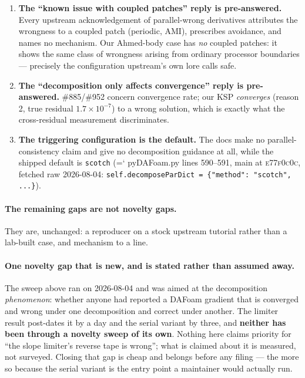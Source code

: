 \documentclass[11pt,a4paper]{article}
\newcommand{\artifact}[1]{{\small\ttfamily\hyphenchar\font=`\-\relax
  \def\_{\textunderscore\allowbreak}#1}}
\newcommand{\commit}[1]{\textsc{\small #1}}
\begin{document}
\begin{enumerate}
\item \textbf{The ``known issue with coupled patches'' reply is pre-answered.} Every upstream
acknowledgement of parallel-wrong derivatives attributes the wrongness to a coupled patch
(periodic, AMI), prescribes avoidance, and names no mechanism. Our Ahmed-body case has
\emph{no} coupled patches: it shows the same class of wrongness arising from ordinary
processor boundaries --- precisely the configuration upstream's own lore calls safe.
\item \textbf{The ``decomposition only affects convergence'' reply is pre-answered.}
\#885/\#952 concern convergence rate; our KSP \emph{converges} (reason 2, true residual
\(1.7\times10^{-7}\)) to a wrong solution, which is exactly what the cross-residual
measurement discriminates.
\item \textbf{The triggering configuration is the default.} The docs make no
parallel-consistency claim and give no decomposition guidance at all, while the shipped
default is \texttt{scotch} (\artifact{pyDAFoam.py} lines 590--591, main at \commit{e77f0c0c},
fetched raw 2026-08-04: \texttt{self.decomposeParDict = \{"method": "scotch", ...\}}).
\end{enumerate}

\paragraph{The remaining gaps are not novelty gaps.} They are, unchanged: a reproducer on a
stock upstream tutorial rather than a lab-built case, and mechanism to a line.

\paragraph{One novelty gap that is new, and is stated rather than assumed away.} The sweep
above ran on 2026-08-04 and was aimed at the decomposition \emph{phenomenon}: whether anyone
had reported a DAFoam gradient that is converged and wrong under one decomposition and correct
under another. The limiter result post-dates it by a day and the serial variant by three, and
\textbf{neither has been through a novelty sweep of its own}. Nothing here claims priority for
``the slope limiter's reverse tape is wrong''; what is claimed about it is measured, not
surveyed. Closing that gap is cheap and belongs before any filing --- the more so because the
serial variant is the entry point a maintainer would actually run.
\end{document}
